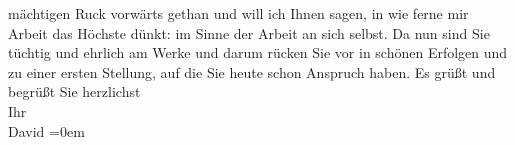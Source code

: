 \begin{ledgroupsized}[t]{13cm}
               mächtigen Ruck vorwärts gethan und will ich Ihnen sagen, in wie ferne mir Arbeit das
               Höchste dünkt: im Sinne der Arbeit an sich selbst. Da nun sind Sie tüchtig und
               ehrlich am Werke und darum rücken Sie vor in schönen Erfolgen und zu einer ersten
               Stellung, auf die Sie heute schon Anspruch haben.\pend
           \pstart
           Es grüßt und begrüßt Sie herzlichst{\\[\baselineskip]}Ihr{\\[\baselineskip]}\spacefill\mbox{David}\pend
           \leftskip=0em{}          \endnumbering{}\end{ledgroupsized}  \newcommand{\dateiname}{L00411}\newcommand{\titel}{Jakob Julius David an Arthur Schnitzler, 23. 12. 1894}\newcommand{\editorInnen}{Martin Anton Müller und Gerd-Hermann Susen}
      